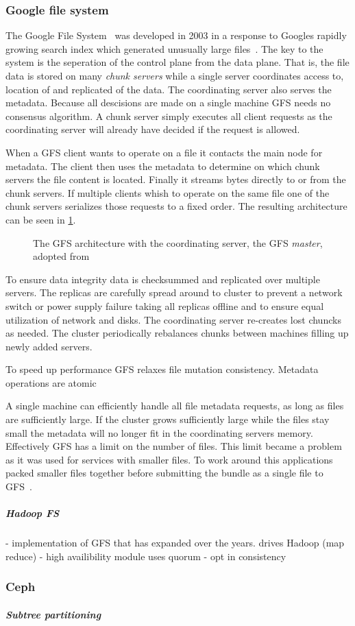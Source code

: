 \subsubsection*{Google file system}
The Google File System~\cite{GFS} was developed in 2003 in a response to Googles rapidly growing search index which generated unusually large files~\cite{GFS_interview}. The key to the system is the seperation of the control plane from the data plane. That is, the file data is stored on many \textit{chunk servers} while a single server coordinates access to, location of and replicated of the data. The coordinating server also serves the metadata. Because all descisions are made on a single machine \textsc{GFS} needs no consensus algorithm. A chunk server simply executes all client requests as the coordinating server will already have decided if the request is allowed. 

When a \textsc{GFS} client wants to operate on a file it contacts the main node for metadata. The client then uses the metadata to determine on which chunk servers the file content is located. Finally it streams bytes directly to or from the chunk servers. If multiple clients whish to operate on the same file one of the chunk servers serializes those requests to a fixed order. The resulting architecture can be seen in \cref{fig:GFS_arch}.
%

\begin{figure}[htbp]
	\centering
	
	\caption{The \textsc{GFS} architecture with the coordinating server, the \textsc{GFS} \textit{master}, adopted from~\cite{GFS}}
	\label{fig:GFS_arch}
\end{figure}
 
To ensure data integrity data is checksummed and replicated over multiple servers. The replicas are carefully spread around to cluster to prevent a network switch or power supply failure taking all replicas offline and to ensure equal utilization of network and disks. The coordinating server re-creates lost chuncks as needed. The cluster periodically rebalances chunks between machines filling up newly added servers.

To speed up performance \textsc{GFS} relaxes file mutation consistency. Metadata operations are atomic 

A single machine can efficiently handle all file metadata requests, as long as files are sufficiently large. If the cluster grows sufficiently large while the files stay small the metadata will no longer fit in the coordinating servers memory. Effectively \textsc{GFS} has a limit on the number of files. This limit became a problem as it was used for services with smaller files. To work around this applications packed smaller files together before submitting the bundle as a single file to \textsc{GFS}~\cite{GFS_interview}.


\subparagraph*{Hadoop FS}
- implementation of GFS that has expanded over the years. drives Hadoop (map reduce) 
- high availibility module uses quorum
- opt in consistency

\subsubsection*{Ceph}

\subparagraph{Subtree partitioning}
